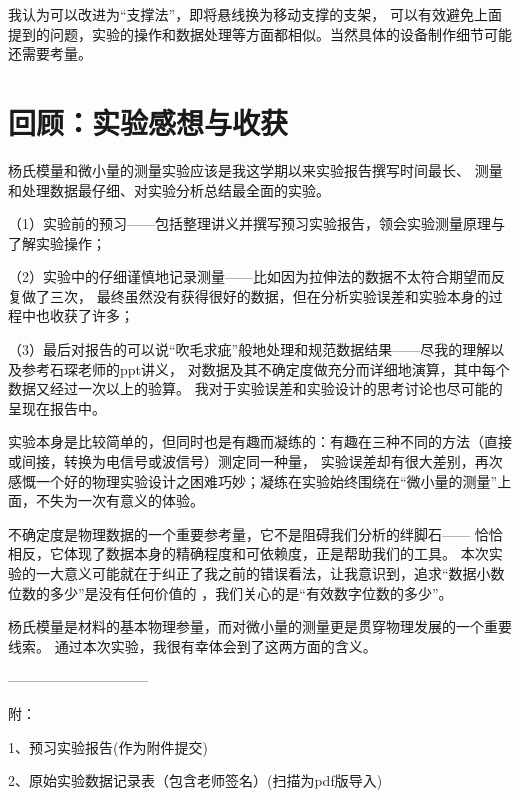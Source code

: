 \documentclass[11pt]{article}
\begin{document}
我认为可以改进为“支撑法”，即将悬线换为移动支撑的支架，
可以有效避免上面提到的问题，实验的操作和数据处理等方面都相似。当然具体的设备制作细节可能还需要考量。



\section{回顾：实验感想与收获}

杨氏模量和微小量的测量实验应该是我这学期以来实验报告撰写时间最长、
测量和处理数据最仔细、对实验分析总结最全面的实验。

（1）实验前的预习——包括整理讲义并撰写预习实验报告，领会实验测量原理与了解实验操作；

（2）实验中的仔细谨慎地记录测量——比如因为拉伸法的数据不太符合期望而反复做了三次，
最终虽然没有获得很好的数据，但在分析实验误差和实验本身的过程中也收获了许多；

（3）最后对报告的可以说“吹毛求疵”般地处理和规范数据结果——尽我的理解以及参考石琛老师的ppt讲义，
对数据及其不确定度做充分而详细地演算，其中每个数据又经过一次以上的验算。
我对于实验误差和实验设计的思考讨论也尽可能的呈现在报告中。

实验本身是比较简单的，但同时也是有趣而凝练的：有趣在三种不同的方法（直接或间接，转换为电信号或波信号）测定同一种量，
实验误差却有很大差别，再次感慨一个好的物理实验设计之困难巧妙；凝练在实验始终围绕在“微小量的测量”上面，不失为一次有意义的体验。

不确定度是物理数据的一个重要参考量，它不是阻碍我们分析的绊脚石——
恰恰相反，它体现了数据本身的精确程度和可依赖度，正是帮助我们的工具。
本次实验的一大意义可能就在于纠正了我之前的错误看法，让我意识到，追求“数据小数位数的多少”是没有任何价值的
，我们关心的是“有效数字位数的多少”。

杨氏模量是材料的基本物理参量，而对微小量的测量更是贯穿物理发展的一个重要线索。
通过本次实验，我很有幸体会到了这两方面的含义。


\bigskip
\bigskip
——————————

附：

1、预习实验报告(作为附件提交)

2、原始实验数据记录表（包含老师签名）(扫描为pdf版导入)



\end{document}
